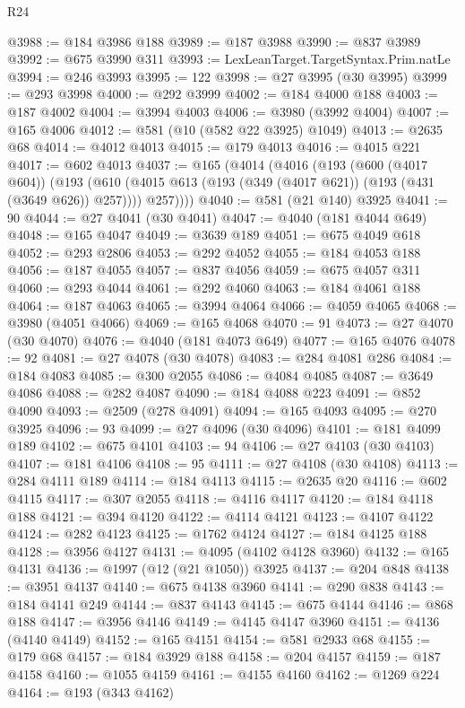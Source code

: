 \begin{lexlean}{R24}
\begin{coremodule}
@3988 := @184 @3986 @188
@3989 := @187 @3988
@3990 := @837 @3989
@3992 := @675 @3990 @311
@3993 := LexLeanTarget.TargetSyntax.Prim.natLe
@3994 := @246 @3993
@3995 := 122
@3998 := @27 @3995 (@30 @3995)
@3999 := @293 @3998
@4000 := @292 @3999
@4002 := @184 @4000 @188
@4003 := @187 @4002
@4004 := @3994 @4003
@4006 := @3980 (@3992 @4004)
@4007 := @165 @4006
@4012 := @581 (@10 (@582 @22 @3925) @1049)
@4013 := @2635 @68
@4014 := @4012 @4013
@4015 := @179 @4013
@4016 := @4015 @221
@4017 := @602 @4013
@4037 := @165
    (@4014
      (@4016
        (@193
          (@600 (@4017 @604))
          (@193
            (@610 (@4015 @613 (@193 (@349 (@4017 @621)) (@193 (@431 (@3649 @626)) @257))))
            @257))))
@4040 := @581 (@21 @140) @3925
@4041 := 90
@4044 := @27 @4041 (@30 @4041)
@4047 := @4040 (@181 @4044 @649)
@4048 := @165 @4047
@4049 := @3639 @189
@4051 := @675 @4049 @618
@4052 := @293 @2806
@4053 := @292 @4052
@4055 := @184 @4053 @188
@4056 := @187 @4055
@4057 := @837 @4056
@4059 := @675 @4057 @311
@4060 := @293 @4044
@4061 := @292 @4060
@4063 := @184 @4061 @188
@4064 := @187 @4063
@4065 := @3994 @4064
@4066 := @4059 @4065
@4068 := @3980 (@4051 @4066)
@4069 := @165 @4068
@4070 := 91
@4073 := @27 @4070 (@30 @4070)
@4076 := @4040 (@181 @4073 @649)
@4077 := @165 @4076
@4078 := 92
@4081 := @27 @4078 (@30 @4078)
@4083 := @284 @4081 @286
@4084 := @184 @4083
@4085 := @300 @2055
@4086 := @4084 @4085
@4087 := @3649 @4086
@4088 := @282 @4087
@4090 := @184 @4088 @223
@4091 := @852 @4090
@4093 := @2509 (@278 @4091)
@4094 := @165 @4093
@4095 := @270 @3925
@4096 := 93
@4099 := @27 @4096 (@30 @4096)
@4101 := @181 @4099 @189
@4102 := @675 @4101
@4103 := 94
@4106 := @27 @4103 (@30 @4103)
@4107 := @181 @4106
@4108 := 95
@4111 := @27 @4108 (@30 @4108)
@4113 := @284 @4111 @189
@4114 := @184 @4113
@4115 := @2635 @20
@4116 := @602 @4115
@4117 := @307 @2055
@4118 := @4116 @4117
@4120 := @184 @4118 @188
@4121 := @394 @4120
@4122 := @4114 @4121
@4123 := @4107 @4122
@4124 := @282 @4123
@4125 := @1762 @4124
@4127 := @184 @4125 @188
@4128 := @3956 @4127
@4131 := @4095 (@4102 @4128 @3960)
@4132 := @165 @4131
@4136 := @1997 (@12 (@21 @1050)) @3925
@4137 := @204 @848
@4138 := @3951 @4137
@4140 := @675 @4138 @3960
@4141 := @290 @838
@4143 := @184 @4141 @249
@4144 := @837 @4143
@4145 := @675 @4144
@4146 := @868 @188
@4147 := @3956 @4146
@4149 := @4145 @4147 @3960
@4151 := @4136 (@4140 @4149)
@4152 := @165 @4151
@4154 := @581 @2933 @68
@4155 := @179 @68
@4157 := @184 @3929 @188
@4158 := @204 @4157
@4159 := @187 @4158
@4160 := @1055 @4159
@4161 := @4155 @4160
@4162 := @1269 @224
@4164 := @193 (@343 @4162)

\end{coremodule}
\end{lexlean}
